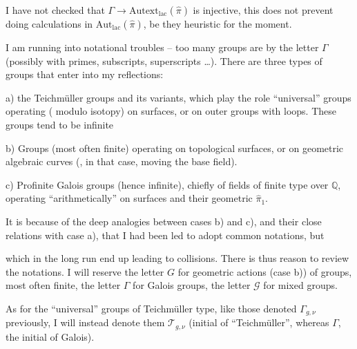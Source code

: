 I have not checked that $\Gamma\longrightarrow\mathrm{Autext}_{\mathrm{lac}}(\widehat\pi)$ is injective, this does not prevent doing calculations in $\mathrm{Aut}_{\mathrm{lac}}(\widehat\pi)$, be they heuristic for the moment.



I am running into notational troubles -- too many groups are  by the letter $\Gamma$ (possibly with primes, subscripts, superscripts \ldots). There are three types of groups that enter into my reflections:

a) the Teichmüller groups and its variants, which play the role  ``universal'' groups operating ( modulo isotopy) on surfaces, or on outer groups  with loops. These groups tend to be infinite

b) Groups (most often finite) operating on topological surfaces, or on geometric algebraic curves (, in that case, moving the base field).


c) Profinite Galois groups (hence infinite), chiefly of fields of finite type over $\mathbb Q$, operating ``arithmetically'' on surfaces and their geometric $\widehat{\pi}_1$.

It is because of the deep analogies between cases b) and c), and their close relations with case a), that I had been led to adopt common notations, but



which in the long run end up leading to collisions. There is thus reason to review the notations. I will reserve the letter $G$  for geometric actions (case b)) of groups, most often finite, the letter $\Gamma$  for Galois groups, the letter $\mathcal G$ for mixed groups.

As for the ``universal'' groups of Teichmüller type, like those denoted $\Gamma_{g,\nu}$ previously, I will instead denote them  $\mathcal T_{g,\nu}$ (initial of ``Teichmüller'', whereas $\Gamma$,   the initial of Galois).

